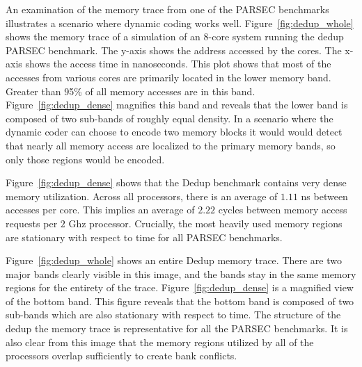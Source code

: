 An examination of the memory trace from one of the PARSEC benchmarks illustrates a scenario where dynamic coding works well. Figure~\ref{fig:dedup_whole} shows the memory trace of a simulation of an 8-core system running the dedup PARSEC benchmark. The y-axis shows the address accessed by the cores. The x-axis shows the access time in nanoseconds. This plot shows that most of the accesses from various cores are primarily located in the lower memory band. Greater than 95\% of all memory accesses are in this band. Figure~\ref{fig:dedup_dense} magnifies this band and reveals that the lower band is composed of two sub-bands of roughly equal density. In a scenario where the dynamic coder can choose to encode two memory blocks it would  would detect that nearly all memory access are localized to the primary memory bands, so only those regions would be encoded.


Figure~\ref{fig:dedup_dense} shows that the Dedup benchmark contains very dense memory utilization. Across all processors, there is an average of $1.11$ ns between accesses per core. This implies an average of $2.22$ cycles between memory access requests per $2$ Ghz processor. Crucially, the most heavily used memory regions are stationary with respect to time for all PARSEC benchmarks. 

Figure~\ref{fig:dedup_whole} shows an entire Dedup memory trace. There are two major bands clearly visible in this image, and the bands stay in the same memory regions for the entirety of the trace. Figure~\ref{fig:dedup_dense} is a magnified view of the bottom band. This figure reveals that the bottom band is composed of two sub-bands which are also stationary with respect to time. The structure of the dedup the memory trace is representative for all the PARSEC benchmarks. It is also clear from this image that the memory regions utilized by all of the processors overlap sufficiently to create bank conflicts.

